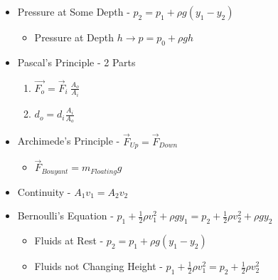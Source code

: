 \documentclass[10pt,letterpaper,final,twoside,notitlepage]{article}
\numberwithin{equation}{section} %
\begin{document}
	\begin{itemize}[noitemsep]
		\item Pressure at Some Depth - $p_{2} = p_{1} + \rho g \left( y_{1}-y_{2} \right)$
			\begin{itemize}
				\item Pressure at Depth $h \rightarrow p = p_{0} + \rho gh$
			\end{itemize}
		\item Pascal's Principle - 2 Parts
			\begin{enumerate}[noitemsep]
				\item $\vec{F_{o}} = \vec{F}_{i}\ \frac{A_{o}}{A_{i}}$
				\item $d_{o} = d_{i} \frac{A_{i}}{A_{o}}$
			\end{enumerate}
		\item Archimede's Principle - $\vec{F}_{Up} = \vec{F}_{Down}$
			\begin{itemize}[noitemsep]
				\item $\vec{F}_{Bouyant} = m_{Floating}g$
			\end{itemize}
		\item Continuity - $A_{1}v_{1} = A_{2}v_{2}$
		\item Bernoulli's Equation - $p_{1} + \frac{1}{2} \rho v_{1}^{2} + \rho gy_{1} = p_{2} + 	\frac{1}{2} \rho v_{2}^{2} + \rho gy_{2}$
			\begin{itemize}[noitemsep]
				\item Fluids at Rest - $p_{2} = p_{1} + \rho g \left( y_{1}-y_{2} \right)$
				\item Fluids not Changing Height - $p_{1} + \frac{1}{2} \rho v_{1}^{2} = p_{2} + 	\frac{1}{2} \rho v_{2}^{2}$
			\end{itemize}
	\end{itemize}
\end{document}
